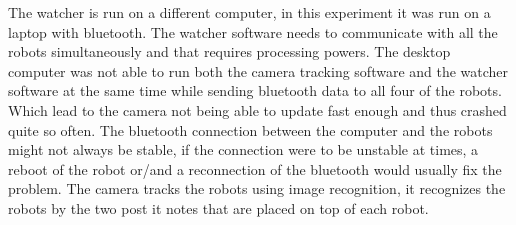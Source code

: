 The watcher is run on a different computer, in this experiment it was run on a laptop with bluetooth. The watcher software needs to communicate with all the robots simultaneously and that requires processing powers.
The desktop computer was not able to run both the camera tracking software and the watcher software at the same time while sending bluetooth data to all four of the robots. Which lead to the camera not being able to update fast enough and thus crashed quite so often. The bluetooth connection between the computer and the robots might not always be stable, if the connection were to be unstable at times, a reboot of the robot or/and a reconnection of the bluetooth would usually fix the problem.
The camera tracks the robots using image recognition, it recognizes the robots by the two post it notes that are placed on top of each robot. 



